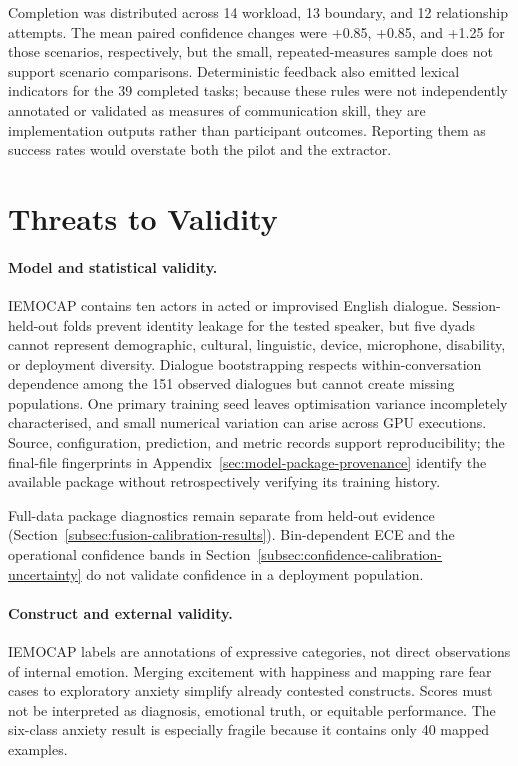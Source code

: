 Completion was distributed across 14 workload, 13 boundary, and 12 relationship attempts. The mean paired confidence changes were +0.85, +0.85, and +1.25 for those scenarios, respectively, but the small, repeated-measures sample does not support scenario comparisons. Deterministic feedback also emitted lexical indicators for the 39 completed tasks; because these rules were not independently annotated or validated as measures of communication skill, they are implementation outputs rather than participant outcomes. Reporting them as success rates would overstate both the pilot and the extractor.

\section{Threats to Validity}
\label{sec:evaluation-limitations}

\paragraph{Model and statistical validity.}
IEMOCAP contains ten actors in acted or improvised English dialogue. Session-held-out folds prevent identity leakage for the tested speaker, but five dyads cannot represent demographic, cultural, linguistic, device, microphone, disability, or deployment diversity. Dialogue bootstrapping respects within-conversation dependence among the 151 observed dialogues but cannot create missing populations. One primary training seed leaves optimisation variance incompletely characterised, and small numerical variation can arise across GPU executions. Source, configuration, prediction, and metric records support reproducibility; the final-file fingerprints in Appendix~\ref{sec:model-package-provenance} identify the available package without retrospectively verifying its training history.

Full-data package diagnostics remain separate from held-out evidence (Section~\ref{subsec:fusion-calibration-results}). Bin-dependent ECE and the operational confidence bands in Section~\ref{subsec:confidence-calibration-uncertainty} do not validate confidence in a deployment population.

\paragraph{Construct and external validity.}
IEMOCAP labels are annotations of expressive categories, not direct observations of internal emotion. Merging excitement with happiness and mapping rare fear cases to exploratory anxiety simplify already contested constructs. Scores must not be interpreted as diagnosis, emotional truth, or equitable performance. The six-class anxiety result is especially fragile because it contains only 40 mapped examples.

